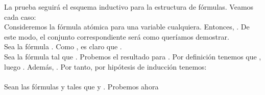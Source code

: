 \begin{isabellebody}
\begin{isamarkuptext}
  \begin{demostracion}
    La prueba seguirá el esquema inductivo para la estructura de fórmulas. Veamos cada caso:\\
    Consideremos la fórmula atómica  para  una variable cualquiera. Entonces, 
    . De este modo, el conjunto  correspondiente será 
     como queríamos demostrar.\\
    Sea la fórmula \isa{{\isasymbottom}}. Como , es claro que .\\
    Sea la fórmula  tal que . Probemos el resultado para . Por 
    definición tenemos que , luego . Además, 
    . Por tanto, por hipótesis de inducción tenemos:\\
    \\
    Sean las fórmulas  y  tales que  y . Probemos ahora

\end{demostracion}
\end{isamarkuptext}
\end{isabellebody}
